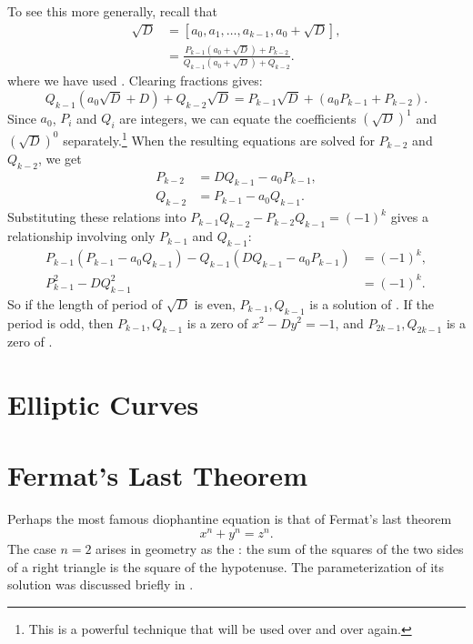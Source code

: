 To see this more generally, recall that
\[
\begin{aligned}
 \sqrt{D} & = [a_0, a_1, \ldots, a_{k-1}, a_0 + \sqrt{D}], \\
    & \displaystyle = \frac{P_{k-1} (a_0 + \sqrt{D}) + P_{k-2}}{Q_{k-1} (a_0 + \sqrt{D}) + Q_{k-2}}.
\end{aligned}
\]
where we have used .  Clearing
fractions gives:
\[
Q_{k-1} ( a_0 \sqrt{D} + D) + Q_{k-2} \sqrt{D} = P_{k-1} \sqrt{D} +
(a_0 P_{k-1} + P_{k-2}).
\]
Since $a_0$, $P_i$ and $Q_i$ are integers, we can equate the
coefficients $(\sqrt{D})^1$ and $(\sqrt{D})^0$
separately.\footnote{This is a powerful technique that will be used
over and over again.}  When the resulting equations are solved for
$P_{k-2}$ and $Q_{k-2}$, we get
\[
\begin{aligned}
 P_{k-2} & = D Q_{k-1} - a_0 P_{k-1}, \\
 Q_{k-2} & = P_{k-1} - a_0 Q_{k-1}.
\end{aligned}
\]
Substituting these relations into $P_{k-1} Q_{k-2} - P_{k-2} Q_{k-1} =
(-1)^k$ gives a relationship involving only $P_{k-1}$ and $Q_{k-1}$:
\[
\begin{aligned}
P_{k-1} (P_{k-1} - a_0 Q_{k-1}) - Q_{k-1}(D Q_{k-1} - a_0 P_{k-1})
  & = (-1)^k, \\
P_{k-1}^2 - D Q_{k-1}^2 & = (-1)^k.
\end{aligned}
\]
So if the length of period of $\sqrt{D}$ is even, $P_{k-1}, Q_{k-1}$
is a solution of .  If the period is odd, then
$P_{k-1}, Q_{k-1}$ is a zero of $x^2 - D y^2 = -1$, and $P_{2k-1},
Q_{2k-1}$ is a zero of .

\section{Elliptic Curves}
\label{EllipticCurve:Sec}

\section{Fermat's Last Theorem}
\label{FLT:Sec}

Perhaps the most famous diophantine equation is that of Fermat's
last theorem
\begin{equation}\label{FLT:Eq}
x^n + y^n = z^n.
\end{equation}
The case $n=2$ arises in geometry as the :
the sum of the squares of the two sides of a right triangle is the
square of the hypotenuse. The parameterization of its solution was
discussed briefly in .

